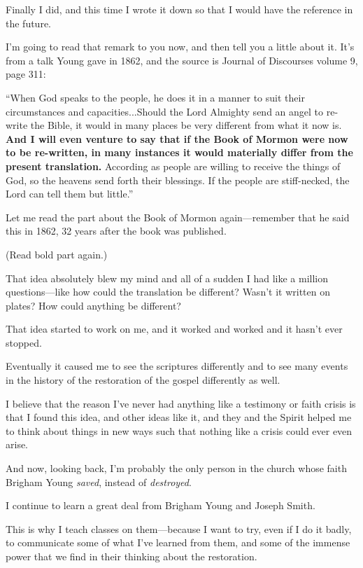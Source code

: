 \begin{compactitem}
\begin{compactitem}
					\item Finally I did, and this time I wrote it down so that I would have the reference in the future.
					\item I'm going to read that remark to you now, and then tell you a little about it. It's from a talk Young gave in 1862, and the source is Journal of Discourses volume 9, page 311:
						\begin{compactitem}
							\item ``When God speaks to the people, he does it in a manner to suit their circumstances and capacities...Should the Lord Almighty send an angel to re-write the Bible, it would in many places be very different from what it now is. \textbf{And I will even venture to say that if the Book of Mormon were now to be re-written, in many instances it would materially differ from the present translation.} According as people are willing to receive the things of God, so the heavens send forth their blessings. If the people are stiff-necked, the Lord can tell them but little.''
							\item Let me read the part about the Book of Mormon again---remember that he said this in 1862, 32 years after the book was published.
							\item (Read bold part again.)
							\item That idea absolutely blew my mind and all of a sudden I had like a million questions---like how could the translation be different? Wasn't it written on plates? How could anything be different?
							\item That idea started to work on me, and it worked and worked and it hasn't ever stopped.
							\item Eventually it caused me to see the scriptures differently and to see many events in the history of the restoration of the gospel differently as well.
							\item I believe that the reason I've never had anything like a testimony or faith crisis is that I found this idea, and other ideas like it, and they and the Spirit helped me to think about things in new ways such that nothing like a crisis could ever even arise.
						\end{compactitem}
					\item And now, looking back, I'm probably the only person in the church whose faith Brigham Young \textit{saved}, instead of \textit{destroyed}.
					\item I continue to learn a great deal from Brigham Young and Joseph Smith.
					\item This is why I teach classes on them---because I want to try, even if I do it badly, to communicate some of what I've learned from them, and some of the immense power that we find in their thinking about the restoration.

\end{compactitem}
\end{compactitem}

